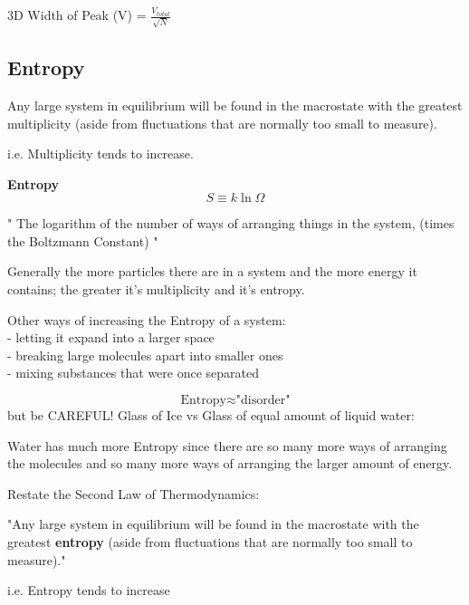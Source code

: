 3D Width of Peak (V) = $\frac{V_{total}}{\sqrt{N}}$

\subsection{Entropy}
Any large system in equilibrium will be found in the macrostate with the greatest multiplicity (aside from fluctuations that are normally too small to measure).

i.e. Multiplicity tends to increase.

\begin{shaded}
\textbf{Entropy}
\begin{equation}
    S \equiv k\ln\Omega
\end{equation}
\end{shaded}
" The logarithm of the number of ways of arranging things in the system, (times the Boltzmann Constant) "

Generally the more particles there are in a system and the more energy it contains; the greater it's multiplicity and it's entropy.

Other ways of increasing the Entropy of a system:\\
- letting it expand into a larger space \\
- breaking large molecules apart into smaller ones\\
- mixing substances that were once separated

\[ \text{Entropy} \approx \text{"disorder"} \]
but be CAREFUL! 
Glass of Ice vs Glass of equal amount of liquid water:

Water has much more Entropy since there are so many more ways of arranging the molecules and so many more ways of arranging the larger amount of energy.

Restate the Second Law of Thermodynamics:

"Any large system in equilibrium will be found in the macrostate with the greatest \textbf{entropy} (aside from fluctuations that are normally too small to measure)."

i.e. Entropy tends to increase

